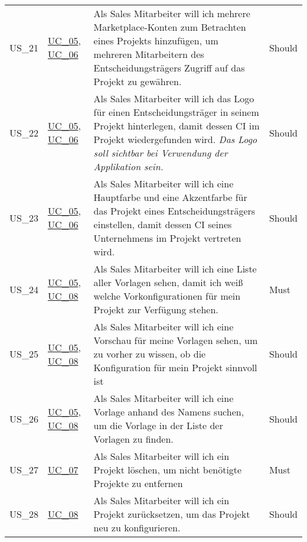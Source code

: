 \begin{footnotesize}
\begin{longtable}[L L L L]{ p{} p{} p{} p{} }
      \hypertarget{Ref:US21}{US\_21} & \hyperlink{Ref:UC5}{UC\_05}, \newline \hyperlink{Ref:UC6}{UC\_06} & Als Sales Mitarbeiter will ich mehrere Marketplace-Konten zum Betrachten eines Projekts hinzufügen, um mehreren Mitarbeitern des Entscheidungsträgers Zugriff auf das Projekt zu gewähren. & Should \\
      \hypertarget{Ref:US22}{US\_22} & \hyperlink{Ref:UC5}{UC\_05}, \newline \hyperlink{Ref:UC6}{UC\_06} & Als Sales Mitarbeiter will ich das Logo für einen Entscheidungsträger in seinem Projekt hinterlegen, damit dessen CI im Projekt wiedergefunden wird. 
      \newline\newline
      \emph{Das Logo soll sichtbar bei Verwendung der Applikation sein.} & Should
      \\
      \hypertarget{Ref:US23}{US\_23} & \hyperlink{Ref:UC5}{UC\_05}, \newline \hyperlink{Ref:UC6}{UC\_06} & Als Sales Mitarbeiter will ich eine Hauptfarbe und eine Akzentfarbe für das Projekt eines Entscheidungsträgers einstellen, damit dessen CI seines Unternehmens im Projekt vertreten wird. & Should \\
      \hypertarget{Ref:US24}{US\_24} & \hyperlink{Ref:UC5}{UC\_05}, \newline \hyperlink{Ref:UC8}{UC\_08} & Als Sales Mitarbeiter will ich eine Liste aller Vorlagen sehen, damit ich weiß welche Vorkonfigurationen für mein Projekt zur Verfügung stehen. & Must \\
      \hypertarget{Ref:US25}{US\_25} & \hyperlink{Ref:UC5}{UC\_05}, \newline \hyperlink{Ref:UC8}{UC\_08} & Als Sales Mitarbeiter will ich eine Vorschau für meine Vorlagen sehen, um zu vorher zu wissen, ob die Konfiguration für mein Projekt sinnvoll ist & Should \\
      \hypertarget{Ref:US26}{US\_26} & \hyperlink{Ref:UC5}{UC\_05}, \newline \hyperlink{Ref:UC8}{UC\_08} & Als Sales Mitarbeiter will ich eine Vorlage anhand des Namens suchen, um die Vorlage in der Liste der Vorlagen zu finden. & Should \\
      \hypertarget{Ref:US27}{US\_27} & \hyperlink{Ref:UC7}{UC\_07} & Als Sales Mitarbeiter will ich ein Projekt löschen, um nicht benötigte Projekte zu entfernen & Must \\
      \hypertarget{Ref:US28}{US\_28} & \hyperlink{Ref:UC8}{UC\_08} & Als Sales Mitarbeiter will ich ein Projekt zurücksetzen, um das Projekt neu zu konfigurieren. & Should \\

\end{longtable}
\end{footnotesize}
